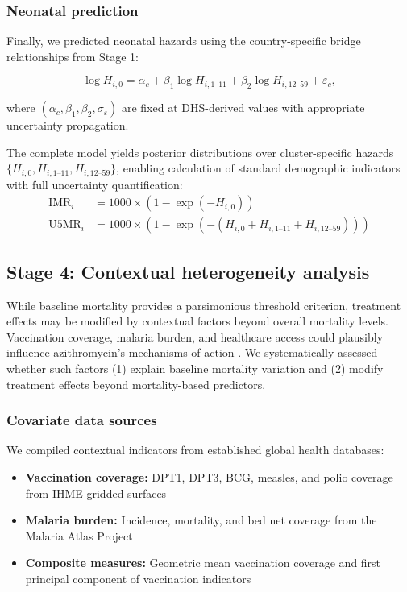 \documentclass[11pt]{article}\usepackage[]{graphicx}\usepackage[]{xcolor}
\begin{document}
\subsubsection{Neonatal prediction}

Finally, we predicted neonatal hazards using the country-specific bridge relationships from Stage 1:

\begin{equation}
\log H_{i,0} = \alpha_c + \beta_1 \log H_{i,1\text{--}11} + \beta_2 \log H_{i,12\text{--}59} + \varepsilon_c,
\end{equation}

\noindent where $(\alpha_c, \beta_1, \beta_2, \sigma_\varepsilon)$ are fixed at DHS-derived values with appropriate uncertainty propagation.

The complete model yields posterior distributions over cluster-specific hazards $\{H_{i,0}, H_{i,1\text{--}11}, H_{i,12\text{--}59}\}$, enabling calculation of standard demographic indicators with full uncertainty quantification:
\begin{align}
\text{IMR}_i &= 1000 \times (1 - \exp(-H_{i,0})) \\
\text{U5MR}_i &= 1000 \times (1 - \exp(-(H_{i,0} + H_{i,1\text{--}11} + H_{i,12\text{--}59})))
\end{align}

\subsection{Stage 4: Contextual heterogeneity analysis}

While baseline mortality provides a parsimonious threshold criterion, treatment effects may be modified by contextual factors beyond overall mortality levels. Vaccination coverage, malaria burden, and healthcare access could plausibly influence azithromycin's mechanisms of action \citep{golding2017lancet}. We systematically assessed whether such factors (1) explain baseline mortality variation and (2) modify treatment effects beyond mortality-based predictors.

\subsubsection{Covariate data sources}

We compiled contextual indicators from established global health databases:
\begin{itemize}
\item \textbf{Vaccination coverage:} DPT1, DPT3, BCG, measles, and polio coverage from IHME gridded surfaces \citep{golding2017lancet}
\item \textbf{Malaria burden:} Incidence, mortality, and bed net coverage from the Malaria Atlas Project
\item \textbf{Composite measures:} Geometric mean vaccination coverage and first principal component of vaccination indicators
\end{itemize}
\end{document}
